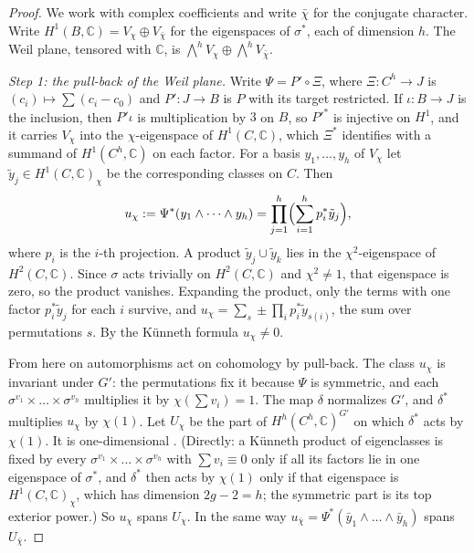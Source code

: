 \documentclass[11pt]{amsart}
\theoremstyle{definition}
\theoremstyle{remark}
\newcommand{\CC}{\mathbb{C}}
\begin{document}
\begin{proof}
We work with complex coefficients and write $\bar\chi$ for the conjugate
character. Write $H^{1}(B,\CC)=V_{\chi}\oplus V_{\bar\chi}$ for the
eigenspaces of $\sigma^{*}$, each of dimension $h$. The Weil plane, tensored
with $\CC$, is $\bigwedge^{h}V_{\chi}\oplus\bigwedge^{h}V_{\bar\chi}$.

\emph{Step 1: the pull-back of the Weil plane.} Write $\Psi=P'\circ\Xi$, where
$\Xi\colon C^{h}\to J$ is $(c_{i})\mapsto\sum(c_{i}-c_{0})$ and $P'\colon J\to
B$ is $P$ with its target restricted. If $\iota\colon B\to J$ is the
inclusion, then $P'\iota$ is multiplication by $3$ on $B$, so $P'^{*}$ is
injective on $H^{1}$, and it carries $V_{\chi}$ into the $\chi$-eigenspace of
$H^{1}(C,\CC)$, which $\Xi^{*}$ identifies with a summand of
$H^{1}(C^{h},\CC)$ on each factor. For a basis $y_{1},\dots,y_{h}$ of
$V_{\chi}$ let $\tilde y_{j}\in H^{1}(C,\CC)_{\chi}$ be the corresponding
classes on $C$. Then
\[
  u_{\chi}:=\Psi^{*}(y_{1}\wedge\dots\wedge y_{h})
  =\prod_{j=1}^{h}\Bigl(\sum_{i=1}^{h}p_{i}^{*}\tilde y_{j}\Bigr),
\]
where $p_{i}$ is the $i$-th projection. A product $\tilde y_{j}\cup\tilde
y_{k}$ lies in the $\chi^{2}$-eigenspace of $H^{2}(C,\CC)$. Since $\sigma$
acts trivially on $H^{2}(C,\CC)$ and $\chi^{2}\ne1$, that eigenspace is zero,
so the product vanishes. Expanding the product, only the terms with one
factor $p_{i}^{*}\tilde y_{j}$ for each $i$ survive, and
$u_{\chi}=\sum_{s}\pm\prod_{i}p_{i}^{*}\tilde y_{s(i)}$, the sum over
permutations $s$. By the K\"unneth formula $u_{\chi}\ne0$.

From here on automorphisms act on cohomology by pull-back. The class
$u_{\chi}$ is invariant under $G'$: the permutations fix it because $\Psi$ is
symmetric, and each $\sigma^{v_{1}}\times\dots\times\sigma^{v_{h}}$ multiplies
it by $\chi(\sum v_{i})=1$. The map $\delta$ normalizes $G'$, and $\delta^{*}$
multiplies $u_{\chi}$ by $\chi(1)$. Let $U_{\chi}$ be the part of
$H^{h}(C^{h},\CC)^{G'}$ on which $\delta^{*}$ acts by $\chi(1)$. It is
one-dimensional \cite[Lemma~1.2]{Sch88}. (Directly: a K\"unneth product of
eigenclasses is fixed by every $\sigma^{v_{1}}\times\dots\times\sigma^{v_{h}}$
with $\sum v_{i}\equiv0$ only if all its factors lie in one eigenspace of
$\sigma^{*}$, and $\delta^{*}$ then acts by $\chi(1)$ only if that eigenspace
is $H^{1}(C,\CC)_{\chi}$, which has dimension $2g-2=h$; the symmetric part is
its top exterior power.) So $u_{\chi}$ spans $U_{\chi}$. In the same way
$u_{\bar\chi}=\Psi^{*}(\bar y_{1}\wedge\dots\wedge\bar y_{h})$ spans
$U_{\bar\chi}$.


\end{proof}
\end{document}
